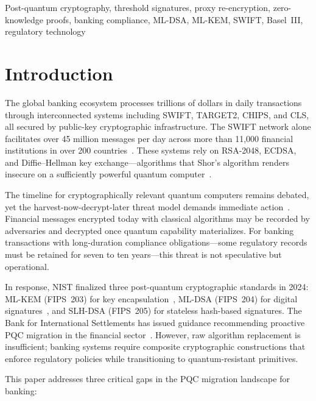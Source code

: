 \documentclass[conference,10pt]{IEEEtran}
\begin{document}
\begin{IEEEkeywords}
Post-quantum cryptography, threshold signatures, proxy re-encryption, zero-knowledge proofs, banking compliance, ML-DSA, ML-KEM, SWIFT, Basel~III, regulatory technology
\end{IEEEkeywords}

\section{Introduction}

The global banking ecosystem processes trillions of dollars in daily transactions through interconnected systems including SWIFT, TARGET2, CHIPS, and CLS, all secured by public-key cryptographic infrastructure. The SWIFT network alone facilitates over 45 million messages per day across more than 11,000 financial institutions in over 200 countries~\cite{swift2023}. These systems rely on RSA-2048, ECDSA, and Diffie--Hellman key exchange---algorithms that Shor's algorithm renders insecure on a sufficiently powerful quantum computer~\cite{shor1997polynomial}.

The timeline for cryptographically relevant quantum computers remains debated, yet the harvest-now-decrypt-later threat model demands immediate action~\cite{mosca2018cybersecurity}. Financial messages encrypted today with classical algorithms may be recorded by adversaries and decrypted once quantum capability materializes. For banking transactions with long-duration compliance obligations---some regulatory records must be retained for seven to ten years---this threat is not speculative but operational.

In response, NIST finalized three post-quantum cryptographic standards in 2024: ML-KEM (FIPS~203) for key encapsulation~\cite{nist2024fips203}, ML-DSA (FIPS~204) for digital signatures~\cite{nist2024fips204}, and SLH-DSA (FIPS~205) for stateless hash-based signatures. The Bank for International Settlements has issued guidance recommending proactive PQC migration in the financial sector~\cite{bis2024pqc}. However, raw algorithm replacement is insufficient; banking systems require composite cryptographic constructions that enforce regulatory policies while transitioning to quantum-resistant primitives.

This paper addresses three critical gaps in the PQC migration landscape for banking:
\end{document}
